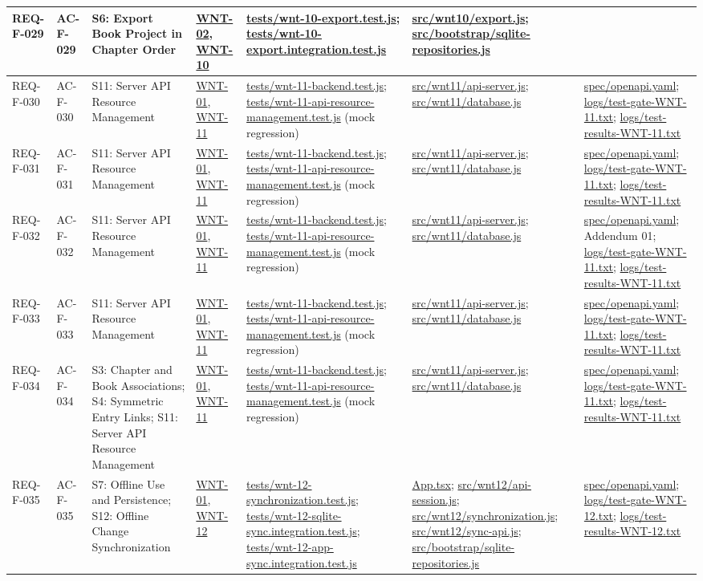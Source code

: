 \documentclass[10pt,a4paper]{article}
\renewcommand{\texttt}[1]{\url{#1}}
\begin{document}
\begin{longtable}{|L{2.5cm}|L{2.6cm}|L{4.4cm}|L{3.3cm}|L{3.3cm}|L{3.3cm}|L{3.3cm}|}
REQ-F-029 & AC-F-029 & S6: Export Book Project in Chapter Order & \texttt{WNT-02}, \texttt{WNT-10} & \texttt{tests/wnt-10-export.test.js}; \texttt{tests/wnt-10-export.integration.test.js} & \texttt{src/wnt10/export.js}; \texttt{src/bootstrap/sqlite-repositories.js} & \\ \hline
REQ-F-030 & AC-F-030 & S11: Server API Resource Management & \texttt{WNT-01}, \texttt{WNT-11} & \texttt{tests/wnt-11-backend.test.js}; \texttt{tests/wnt-11-api-resource-management.test.js} (mock regression) & \texttt{src/wnt11/api-server.js}; \texttt{src/wnt11/database.js} & \texttt{spec/openapi.yaml}; \texttt{logs/test-gate-WNT-11.txt}; \texttt{logs/test-results-WNT-11.txt} \\ \hline
REQ-F-031 & AC-F-031 & S11: Server API Resource Management & \texttt{WNT-01}, \texttt{WNT-11} & \texttt{tests/wnt-11-backend.test.js}; \texttt{tests/wnt-11-api-resource-management.test.js} (mock regression) & \texttt{src/wnt11/api-server.js}; \texttt{src/wnt11/database.js} & \texttt{spec/openapi.yaml}; \texttt{logs/test-gate-WNT-11.txt}; \texttt{logs/test-results-WNT-11.txt} \\ \hline
REQ-F-032 & AC-F-032 & S11: Server API Resource Management & \texttt{WNT-01}, \texttt{WNT-11} & \texttt{tests/wnt-11-backend.test.js}; \texttt{tests/wnt-11-api-resource-management.test.js} (mock regression) & \texttt{src/wnt11/api-server.js}; \texttt{src/wnt11/database.js} & \texttt{spec/openapi.yaml}; Addendum 01; \texttt{logs/test-gate-WNT-11.txt}; \texttt{logs/test-results-WNT-11.txt} \\ \hline
REQ-F-033 & AC-F-033 & S11: Server API Resource Management & \texttt{WNT-01}, \texttt{WNT-11} & \texttt{tests/wnt-11-backend.test.js}; \texttt{tests/wnt-11-api-resource-management.test.js} (mock regression) & \texttt{src/wnt11/api-server.js}; \texttt{src/wnt11/database.js} & \texttt{spec/openapi.yaml}; \texttt{logs/test-gate-WNT-11.txt}; \texttt{logs/test-results-WNT-11.txt} \\ \hline
REQ-F-034 & AC-F-034 & S3: Chapter and Book Associations; S4: Symmetric Entry Links; S11: Server API Resource Management & \texttt{WNT-01}, \texttt{WNT-11} & \texttt{tests/wnt-11-backend.test.js}; \texttt{tests/wnt-11-api-resource-management.test.js} (mock regression) & \texttt{src/wnt11/api-server.js}; \texttt{src/wnt11/database.js} & \texttt{spec/openapi.yaml}; \texttt{logs/test-gate-WNT-11.txt}; \texttt{logs/test-results-WNT-11.txt} \\ \hline
REQ-F-035 & AC-F-035 & S7: Offline Use and Persistence; S12: Offline Change Synchronization & \texttt{WNT-01}, \texttt{WNT-12} & \texttt{tests/wnt-12-synchronization.test.js}; \texttt{tests/wnt-12-sqlite-sync.integration.test.js}; \texttt{tests/wnt-12-app-sync.integration.test.js} & \texttt{App.tsx}; \texttt{src/wnt12/api-session.js}; \texttt{src/wnt12/synchronization.js}; \texttt{src/wnt12/sync-api.js}; \texttt{src/bootstrap/sqlite-repositories.js} & \texttt{spec/openapi.yaml}; \texttt{logs/test-gate-WNT-12.txt}; \texttt{logs/test-results-WNT-12.txt} \\ \hline

\end{longtable}
\end{document}
